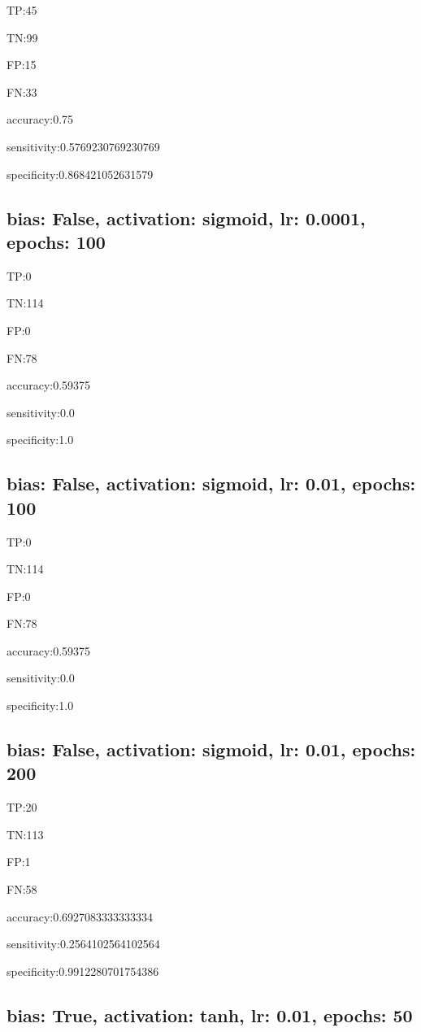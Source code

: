 \documentclass{article}
\begin{document}
TP:45

TN:99

FP:15

FN:33

accuracy:0.75

sensitivity:0.5769230769230769

specificity:0.868421052631579



\subsection{bias: False, activation: sigmoid, lr: 0.0001, epochs: 100}

TP:0

TN:114

FP:0

FN:78

accuracy:0.59375

sensitivity:0.0

specificity:1.0



\subsection{bias: False, activation: sigmoid, lr: 0.01, epochs: 100}

TP:0

TN:114

FP:0

FN:78

accuracy:0.59375

sensitivity:0.0

specificity:1.0



\subsection{bias: False, activation: sigmoid, lr: 0.01, epochs: 200}

TP:20

TN:113

FP:1

FN:58

accuracy:0.6927083333333334

sensitivity:0.2564102564102564

specificity:0.9912280701754386



\subsection{bias: True, activation: tanh, lr: 0.01, epochs: 50}
\end{document}
